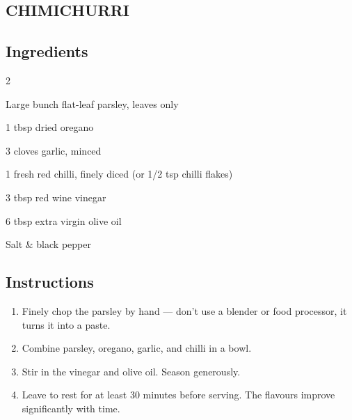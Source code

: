 \begin{minipage}{0.98\textwidth}
\subsection*{CHIMICHURRI}
\subsection*{Ingredients}
\begin{multicols}{2}
\begin{ingredients}
    \item Large bunch flat-leaf parsley, leaves only
    \item 1 tbsp dried oregano
    \item 3 cloves garlic, minced
    \item 1 fresh red chilli, finely diced (or 1/2 tsp chilli flakes)
    \item 3 tbsp red wine vinegar
    \item 6 tbsp extra virgin olive oil
    \item Salt \& black pepper
\end{ingredients}
\end{multicols}
\subsection*{Instructions}
\begin{enumerate}
    \item Finely chop the parsley by hand — don't use a blender or food processor, it turns it into a paste.
    \item Combine parsley, oregano, garlic, and chilli in a bowl.
    \item Stir in the vinegar and olive oil. Season generously.
    \item Leave to rest for at least 30 minutes before serving. The flavours improve significantly with time.
\end{enumerate}

\end{minipage}
\vspace{4em}